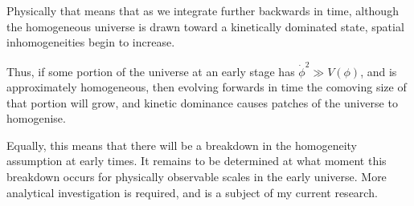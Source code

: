 Physically that means that as we integrate further backwards in time, although the homogeneous universe is drawn toward a kinetically dominated state, spatial inhomogeneities begin to increase.

Thus, if some portion of the universe at an early stage has \(\dot{\phi}^2 \gg V(\phi)\), and is approximately homogeneous, then evolving forwards in time the comoving size of that portion will grow, and kinetic dominance causes patches of the universe to homogenise.

Equally, this means that there will be a breakdown in the homogeneity assumption at early times. It remains to be determined at what moment this breakdown occurs for physically observable scales in the early universe. More analytical investigation is required, and is a subject of my current research.


